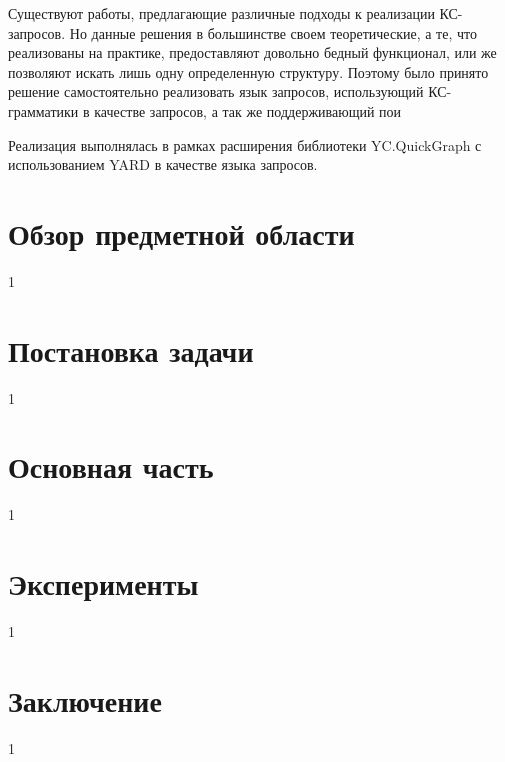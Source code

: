 \documentclass[14pt]{matmex-diploma-custom}
\begin{document}
	Существуют работы, предлагающие различные подходы к реализации КС-запросов. Но данные решения в большинстве своем теоретические, а те, что реализованы на практике, предоставляют довольно бедный функционал, или же позволяют искать лишь одну определенную структуру. Поэтому было принято решение самостоятельно реализовать язык запросов, использующий КС-грамматики в качестве запросов, а так же поддерживающий пои
	
	Реализация выполнялась в рамках расширения библиотеки YC.QuickGraph \cite{YC.QuickGraph} с использованием YARD \cite{YARD} в качестве языка запросов. 
	
\section{Обзор предметной области}
1
\section{Постановка задачи}
1
\section{Основная часть}
1
\section{Эксперименты}
1
\section*{Заключение}
1
\setmonofont[Mapping=tex-text]{CMU Typewriter Text}


\end{document}
